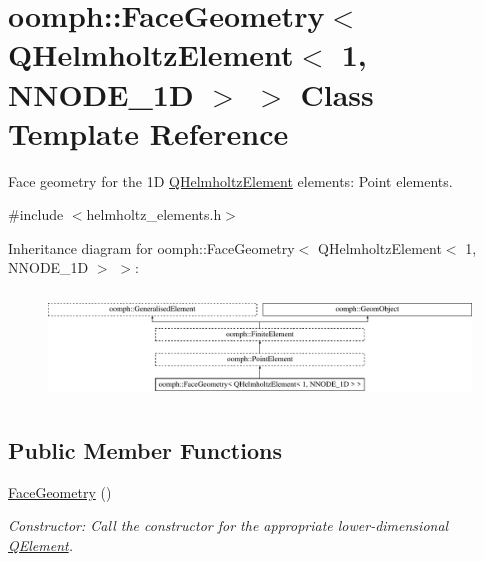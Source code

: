 \hypertarget{classoomph_1_1FaceGeometry_3_01QHelmholtzElement_3_011_00_01NNODE__1D_01_4_01_4}{}\section{oomph\+:\+:Face\+Geometry$<$ Q\+Helmholtz\+Element$<$ 1, N\+N\+O\+D\+E\+\_\+1D $>$ $>$ Class Template Reference}
\label{classoomph_1_1FaceGeometry_3_01QHelmholtzElement_3_011_00_01NNODE__1D_01_4_01_4}


Face geometry for the 1D \hyperlink{classoomph_1_1QHelmholtzElement}{Q\+Helmholtz\+Element} elements\+: Point elements.  




{\ttfamily \#include $<$helmholtz\+\_\+elements.\+h$>$}

Inheritance diagram for oomph\+:\+:Face\+Geometry$<$ Q\+Helmholtz\+Element$<$ 1, N\+N\+O\+D\+E\+\_\+1D $>$ $>$\+:\begin{figure}[H]
\begin{center}
\leavevmode
\includegraphics[height=2.901555cm]{classoomph_1_1FaceGeometry_3_01QHelmholtzElement_3_011_00_01NNODE__1D_01_4_01_4}
\end{center}
\end{figure}
\subsection*{Public Member Functions}
\begin{DoxyCompactItemize}
\item 
\hyperlink{classoomph_1_1FaceGeometry_3_01QHelmholtzElement_3_011_00_01NNODE__1D_01_4_01_4_a81ca6e17dc0549a2880f30e57313be20}{Face\+Geometry} ()
\begin{DoxyCompactList}\small\item\em Constructor\+: Call the constructor for the appropriate lower-\/dimensional \hyperlink{classoomph_1_1QElement}{Q\+Element}. \end{DoxyCompactList}\end{DoxyCompactItemize}
